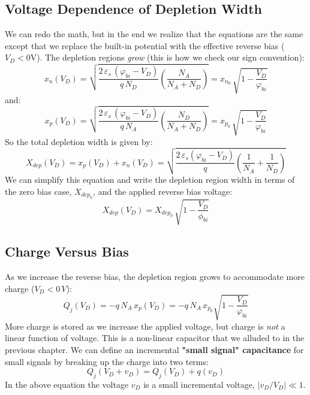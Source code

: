 \subsection{Voltage Dependence of Depletion Width}
We can redo the math, but in the end we realize that the equations are the same except that we replace the built-in potential with the effective reverse bias ($V_D < 0$V).  The depletion regions \emph{grow} (this is how we check our sign convention):
    \begin{equation} 
        x_n(V_D) = \sqrt{ \frac{2\,\varepsilon_s\,(\varphi_{bi} - V_D)}{q\,N_D} \left( \frac{N_A}{N_A + N_D} \right) } = 
        x_{n_0}\,\sqrt{ 1 - \frac{V_D}{\varphi_{bi}} } 
    \end{equation}
and:
    \begin{equation} 
        x_p(V_D) = \sqrt{ \frac{2\,\varepsilon_s\,(\varphi_{bi} - V_D)}{q\,N_A} \left( \frac{N_D}{N_A + N_D} \right) } = 
        x_{p_0}\,\sqrt{ 1 - \frac{V_D}{\varphi_{bi}} } 
    \end{equation}
So the total depletion width is given by:
    \begin{equation}
        X_{dep}(V_D) = x_p(V_D) + x_n(V_D) = 
        \sqrt{ \frac{2\,\varepsilon_s(\varphi_{bi} - V_D)}{q} \left( \frac{1}{N_A} + \frac{1}{N_D} \right) } 
    \end{equation}
We can simplify this equation and write the depletion region width in terms of the zero bias case, $X_{{dep}_0}$, and the applied reverse bias voltage:
    \begin{equation} 
        X_{dep}(V_D) = X_{{dep}_0}\,\sqrt{ 1 - \frac{V_D}{\phi_{bi}}} 
    \end{equation}
\subsection{Charge Versus Bias}
As we increase the reverse bias, the depletion region grows to accommodate more charge ($V_D < 0\,V$):
    \begin{equation} 
        Q_j(V_D) =  -q\,N_A\,x_p(V_D) = -q\,N_A\,x_{p_0}\sqrt{ 1 - \frac{V_D}{\varphi_{bi}} }
    \end{equation}
More charge is stored as we increase the applied voltage, but charge is \textit{not} a linear function of voltage.  This is a non-linear capacitor that we alluded to in the previous chapter.  We can define an incremental \textbf{"small signal" capacitance} for small signals by breaking up the charge into two terms:
    \begin{equation} 
        Q_j(V_D + v_D) = Q_j(V_D) + q(v_D) 
    \end{equation}
In the above equation the voltage $v_D$ is a small incremental voltage, $|v_D/V_D| \ll 1$.
